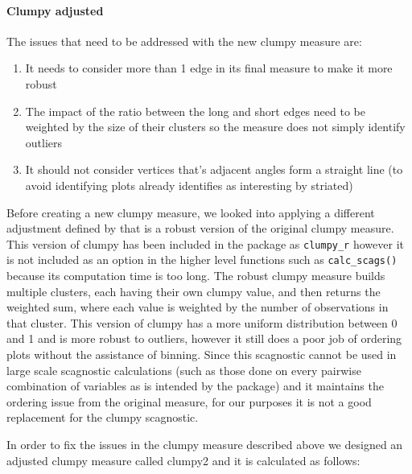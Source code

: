 \paragraph{Clumpy adjusted}\label{clumpy-adjusted}

The issues that need to be addressed with the new clumpy measure are:

\begin{enumerate}
\def\labelenumi{\arabic{enumi}.}
\tightlist
\item
  It needs to consider more than 1 edge in its final measure to make it more robust
\item
  The impact of the ratio between the long and short edges need to be weighted by the size of their clusters so the measure does not simply identify outliers
\item
  It should not consider vertices that's adjacent angles form a straight line (to avoid identifying plots already identifies as interesting by striated)
\end{enumerate}

Before creating a new clumpy measure, we looked into applying a different adjustment defined by \citet{robust} that is a robust version of the original clumpy measure. This version of clumpy has been included in the package as \texttt{clumpy\_r} however it is not included as an option in the higher level functions such as \texttt{calc\_scags()} because its computation time is too long. The robust clumpy measure builds multiple clusters, each having their own clumpy value, and then returns the weighted sum, where each value is weighted by the number of observations in that cluster. This version of clumpy has a more uniform distribution between 0 and 1 and is more robust to outliers, however it still does a poor job of ordering plots without the assistance of binning. Since this scagnostic cannot be used in large scale scagnostic calculations (such as those done on every pairwise combination of variables as is intended by the package) and it maintains the ordering issue from the original measure, for our purposes it is not a good replacement for the clumpy scagnostic.

In order to fix the issues in the clumpy measure described above we designed an adjusted clumpy measure called clumpy2 and it is calculated as follows:

